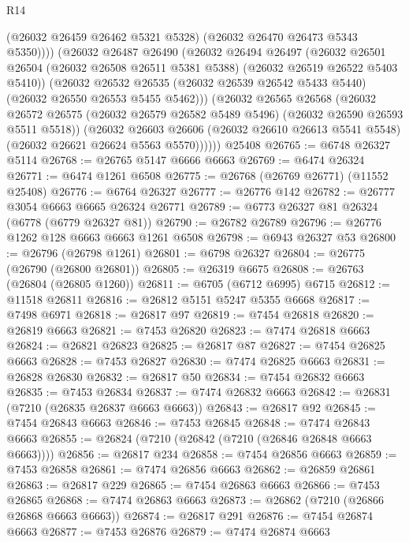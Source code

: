 \begin{lexlean}{R14}
\begin{coremodule}
              (@26032 @26459 @26462 @5321 @5328)
              (@26032 @26470 @26473 @5343 @5350))))
        (@26032
          @26487
          @26490
          (@26032
            @26494
            @26497
            (@26032
              @26501
              @26504
              (@26032 @26508 @26511 @5381 @5388)
              (@26032 @26519 @26522 @5403 @5410))
            (@26032
              @26532
              @26535
              (@26032 @26539 @26542 @5433 @5440)
              (@26032 @26550 @26553 @5455 @5462)))
          (@26032
            @26565
            @26568
            (@26032
              @26572
              @26575
              (@26032 @26579 @26582 @5489 @5496)
              (@26032 @26590 @26593 @5511 @5518))
            (@26032
              @26603
              @26606
              (@26032 @26610 @26613 @5541 @5548)
              (@26032 @26621 @26624 @5563 @5570))))))
    @25408
@26765 := @6748 @26327 @5114
@26768 := @26765 @5147 @6666 @6663
@26769 := @6474 @26324
@26771 := @6474 @1261 @6508
@26775 := @26768 (@26769 @26771) (@11552 @25408)
@26776 := @6764 @26327
@26777 := @26776 @142
@26782 := @26777 @3054 @6663 @6665 @26324 @26771
@26789 := @6773 @26327 @81 @26324 (@6778 (@6779 @26327 @81))
@26790 := @26782 @26789
@26796 := @26776 @1262 @128 @6663 @6663 @1261 @6508
@26798 := @6943 @26327 @53
@26800 := @26796 (@26798 @1261)
@26801 := @6798 @26327
@26804 := @26775 (@26790 (@26800 @26801))
@26805 := @26319 @6675
@26808 := @26763 (@26804 (@26805 @1260))
@26811 := @6705 (@6712 @6995) @6715
@26812 := @11518 @26811
@26816 := @26812 @5151 @5247 @5355 @6668
@26817 := @7498 @6971
@26818 := @26817 @97
@26819 := @7454 @26818
@26820 := @26819 @6663
@26821 := @7453 @26820
@26823 := @7474 @26818 @6663
@26824 := @26821 @26823
@26825 := @26817 @87
@26827 := @7454 @26825 @6663
@26828 := @7453 @26827
@26830 := @7474 @26825 @6663
@26831 := @26828 @26830
@26832 := @26817 @50
@26834 := @7454 @26832 @6663
@26835 := @7453 @26834
@26837 := @7474 @26832 @6663
@26842 := @26831 (@7210 (@26835 @26837 @6663 @6663))
@26843 := @26817 @92
@26845 := @7454 @26843 @6663
@26846 := @7453 @26845
@26848 := @7474 @26843 @6663
@26855 := @26824 (@7210 (@26842 (@7210 (@26846 @26848 @6663 @6663))))
@26856 := @26817 @234
@26858 := @7454 @26856 @6663
@26859 := @7453 @26858
@26861 := @7474 @26856 @6663
@26862 := @26859 @26861
@26863 := @26817 @229
@26865 := @7454 @26863 @6663
@26866 := @7453 @26865
@26868 := @7474 @26863 @6663
@26873 := @26862 (@7210 (@26866 @26868 @6663 @6663))
@26874 := @26817 @291
@26876 := @7454 @26874 @6663
@26877 := @7453 @26876
@26879 := @7474 @26874 @6663

\end{coremodule}
\end{lexlean}

